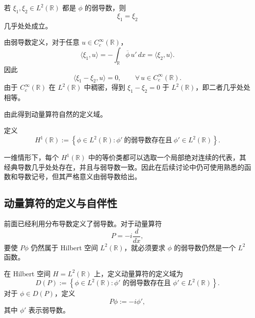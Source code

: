 \documentclass[UTF8,a4paper,11pt,openany]{ctexbook}
\begin{document}
\begin{proposition}[弱导数的唯一性]
若 $\xi_1,\xi_2\in L^2(\mathbb R)$ 都是 $\phi$ 的弱导数，则
\[
\xi_1=\xi_2
\]
几乎处处成立。
\end{proposition}

\begin{proofblock}
由弱导数定义，对于任意 $u\in C_c^\infty(\mathbb R)$，
\[
\langle \xi_1,u\rangle
=
-\int_{\mathbb R}\overline{\phi}\,u'\,dx
=
\langle \xi_2,u\rangle.
\]
因此
\[
\langle \xi_1-\xi_2,u\rangle=0,
\qquad
\forall\,u\in C_c^\infty(\mathbb R).
\]
由于 $C_c^\infty(\mathbb R)$ 在 $L^2(\mathbb R)$ 中稠密，得到 $\xi_1-\xi_2=0$ 于 $L^2(\mathbb R)$，即二者几乎处处相等。
\end{proofblock}

由此得到动量算符自然的定义域。

\begin{definition}
定义
\begin{equation}
    H^1(\mathbb R)
    :=
    \left\{
    \phi\in L^2(\mathbb R):
    \phi'\ \text{的弱导数存在且}\ 
    \phi'\in L^2(\mathbb R)
    \right\}.
\end{equation}
\end{definition}

一维情形下，每个 $H^1(\mathbb R)$ 中的等价类都可以选取一个局部绝对连续的代表，其经典导数几乎处处存在，并且与弱导数一致。因此在后续讨论中仍可使用熟悉的函数和导数记号，但其严格意义由弱导数给出。

\subsection{动量算符的定义与自伴性}

前面已经利用分布导数定义了弱导数。对于动量算符
\[
P=-i\frac{d}{dx},
\]
要使 $P\phi$ 仍然属于 Hilbert 空间 $L^2(\mathbb R)$，就必须要求 $\phi$ 的弱导数仍然是一个 $L^2$ 函数。

\begin{definition}[动量算符]
在 Hilbert 空间 $H=L^2(\mathbb R)$ 上，定义动量算符的定义域为
\begin{equation}
    D(P)
    :=
    \left\{
    \phi\in L^2(\mathbb R):
    \phi'\text{ 的弱导数存在且 }
    \phi'\in L^2(\mathbb R)
    \right\}.
\end{equation}
对于 $\phi\in D(P)$，定义
\begin{equation}
    P\phi:=-i\phi',
\end{equation}
其中 $\phi'$ 表示弱导数。
\end{definition}
\end{document}
